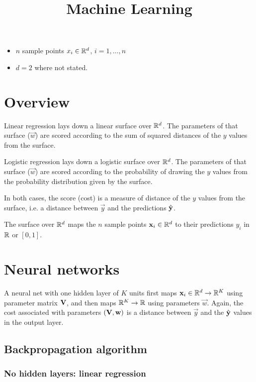 \documentclass[12pt]{article}
\title{Machine Learning}
\begin{document}
\maketitle

\begin{itemize}
\item $n$ sample points $x_i \in \mathbb{R}^d$, $i = 1, \ldots, n$
\item $d = 2$ where not stated.
\end{itemize}

\section*{Overview}

Linear regression lays down a linear surface over $\mathbb{R}^d$. The parameters of
that surface ($\vec w$) are scored according to the sum of squared distances of
the $y$ values from the surface.

Logistic regression lays down a logistic surface over $\mathbb{R}^d$. The parameters of
that surface ($\vec w$) are scored according to the probability of drawing the
$y$ values from the probability distribution given by the surface.

In both cases, the score (cost) is a measure of distance of the $y$ values from
the surface, i.e. a distance between $\vec y$ and the predictions
$\hat {\mathbf y}$.

The surface over $\mathbb{R}^d$ maps the $n$ sample points $\mathbf x_i \in \mathbb{R}^d$ to their
predictions $y_i$ in $\mathbb{R}$ or $[0, 1]$.

\section*{Neural networks}

A neural net with one hidden layer of $K$ units first maps
$\mathbf x_i \in \mathbb{R}^d \to \mathbb{R}^K$ using parameter matrix $\mathbf V$, and then maps
$\mathbb{R}^K \to \mathbb{R}$ using parameters $\vec w$. Again, the cost associated with
parameters $(\mathbf V, \mathbf w)$ is a distance between $\vec y$ and the
$\hat {\mathbf y}$ values in the output layer.

\subsection*{Backpropagation algorithm}

\subsubsection*{No hidden layers: linear regression}
\end{document}
